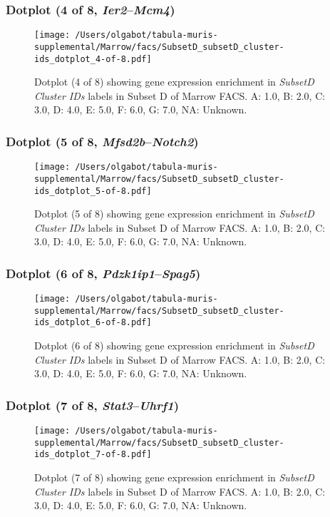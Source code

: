 \clearpage

\subsubsection{Dotplot (4 of 8, \emph{Ier2}--\emph{Mcm4})}
\begin{figure}[h]
\centering
\texttt{[image: /Users/olgabot/tabula-muris-supplemental/Marrow/facs/SubsetD\_subsetD\_cluster-ids\_dotplot\_4-of-8.pdf]}

\caption{ Dotplot (4 of 8)  showing gene expression enrichment in \emph{SubsetD Cluster IDs} labels in Subset D of Marrow FACS. A: 1.0, B: 2.0, C: 3.0, D: 4.0, E: 5.0, F: 6.0, G: 7.0, NA: Unknown.}
\end{figure}


\clearpage

\subsubsection{Dotplot (5 of 8, \emph{Mfsd2b}--\emph{Notch2})}
\begin{figure}[h]
\centering
\texttt{[image: /Users/olgabot/tabula-muris-supplemental/Marrow/facs/SubsetD\_subsetD\_cluster-ids\_dotplot\_5-of-8.pdf]}

\caption{ Dotplot (5 of 8)  showing gene expression enrichment in \emph{SubsetD Cluster IDs} labels in Subset D of Marrow FACS. A: 1.0, B: 2.0, C: 3.0, D: 4.0, E: 5.0, F: 6.0, G: 7.0, NA: Unknown.}
\end{figure}


\clearpage

\subsubsection{Dotplot (6 of 8, \emph{Pdzk1ip1}--\emph{Spag5})}
\begin{figure}[h]
\centering
\texttt{[image: /Users/olgabot/tabula-muris-supplemental/Marrow/facs/SubsetD\_subsetD\_cluster-ids\_dotplot\_6-of-8.pdf]}

\caption{ Dotplot (6 of 8)  showing gene expression enrichment in \emph{SubsetD Cluster IDs} labels in Subset D of Marrow FACS. A: 1.0, B: 2.0, C: 3.0, D: 4.0, E: 5.0, F: 6.0, G: 7.0, NA: Unknown.}
\end{figure}


\clearpage

\subsubsection{Dotplot (7 of 8, \emph{Stat3}--\emph{Uhrf1})}
\begin{figure}[h]
\centering
\texttt{[image: /Users/olgabot/tabula-muris-supplemental/Marrow/facs/SubsetD\_subsetD\_cluster-ids\_dotplot\_7-of-8.pdf]}

\caption{ Dotplot (7 of 8)  showing gene expression enrichment in \emph{SubsetD Cluster IDs} labels in Subset D of Marrow FACS. A: 1.0, B: 2.0, C: 3.0, D: 4.0, E: 5.0, F: 6.0, G: 7.0, NA: Unknown.}
\end{figure}


